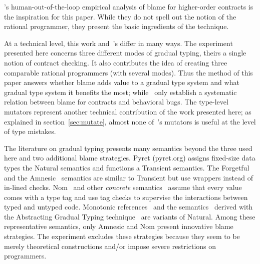 
\citet{lksfd-popl-2020}'s human-out-of-the-loop empirical analysis of blame for
higher-order contracts is the inspiration for this paper.  While they do not
spell out the notion of the rational programmer, they present the basic
ingredients of the technique.

At a technical level, this work and~\citet{lksfd-popl-2020}'s differ in
many ways. The experiment presented here concerns three different modes of
gradual typing, theirs a single notion of contract checking.  It also
contributes the idea of creating three comparable rational programmers
(with several modes). Thus the method of this paper answers whether blame
adds value to a gradual type system and what gradual type system it
benefits the most; while~\citet{lksfd-popl-2020} only establish a
systematic relation between blame for contracts and behavioral bugs. The
type-level mutators represent another technical contribution of the work
presented here; as explained in section~\ref{sec:mutate}, almost none
of~\citet{lksfd-popl-2020}'s mutators is useful at the level of type
mistakes.

The literature on gradual typing presents many semantics beyond the three used
here and two additional blame strategies.  Pyret (pyret.org) assigns fixed-size
data types the Natural semantics and functions a Transient semantics. The
Forgetful~\citep{cl-icfp-2017} and the Amnesic~\citep{gfd-oopsla-2019} semantics
are similar to Transient but use wrappers instead of in-lined checks.
Nom~\citep{mt-oopsla-2017} and other \emph{concrete\/}
semantics~\citep{wnlov-popl-2010, rsfbv-popl-2015, rzv-ecoop-2015,
rat-oopsla-2017} assume that every value comes with a type tag and use tag
checks to supervise the interactions between typed and untyped code.  Monotonic
references~\citep{svctg-esop-2015} and the semantics~\citep{tlt-popl-2019,
etg-icfp-19, tt-scp-20, tgt-popl-18, tt-sas-17} derived with the Abstracting
Gradual Typing technique~\citep{gct-popl-2016} are variants of Natural.  Among
these representative semantics, only Amnesic and Nom present innovative blame
strategies.  The experiment excludes these strategies because they seem to be
merely theoretical constructions and/or impose severe restrictions on
programmers.
 
